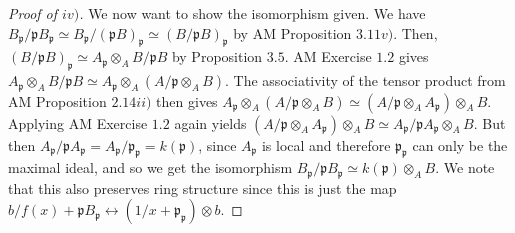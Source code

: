 \documentclass[12pt,letterpaper]{article}
\theoremstyle{definition}
\theoremstyle{remark}
\numberwithin{figure}{problem}
\numberwithin{equation}{section}
\begin{document}
\begin{proof}[Proof of $iv)$]
  \par We now want to show the isomorphism given. We have $B_\mathfrak{p}/\mathfrak{p}B_\mathfrak{p} \simeq B_\mathfrak{p}/(\mathfrak{p}B)_\mathfrak{p} \simeq (B/\mathfrak{p}B)_\mathfrak{p}$ by AM Proposition $3.11v)$. Then, $(B/\mathfrak{p}B)_\mathfrak{p} \simeq A_\mathfrak{p} \otimes_A B/\mathfrak{p}B$ by Proposition $3.5$. AM Exercise $1.2$ gives $A_\mathfrak{p} \otimes_A B/\mathfrak{p}B \simeq A_\mathfrak{p} \otimes_A (A/\mathfrak{p} \otimes_A B)$. The associativity of the tensor product from AM Proposition $2.14ii)$ then gives $A_\mathfrak{p} \otimes_A (A/\mathfrak{p} \otimes_A B) \simeq (A/\mathfrak{p} \otimes_A A_\mathfrak{p}) \otimes_A B$. Applying AM Exercise $1.2$ again yields $(A/\mathfrak{p} \otimes_A A_\mathfrak{p}) \otimes_A B \simeq A_\mathfrak{p}/\mathfrak{p}A_\mathfrak{p} \otimes_A B$. But then $A_\mathfrak{p}/\mathfrak{p}A_\mathfrak{p} = A_\mathfrak{p}/\mathfrak{p}_\mathfrak{p} = k(\mathfrak{p})$, since $A_\mathfrak{p}$ is local and therefore $\mathfrak{p}_\mathfrak{p}$ can only be the maximal ideal, and so we get the isomorphism $B_\mathfrak{p}/\mathfrak{p}B_\mathfrak{p} \simeq k(\mathfrak{p}) \otimes_A B$. We note that this also preserves ring structure since this is just the map $b/f(x) + \mathfrak{p}B_\mathfrak{p} \leftrightarrow (1/x + \mathfrak{p}_\mathfrak{p}) \otimes b$.
\end{proof}

\printbibliography
\end{document}
